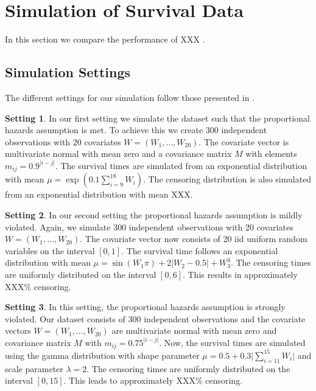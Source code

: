 \documentclass[12pt, a4paper]{article}
\theoremstyle{definition}
\newtheorem{setting}{Setting}
\theoremstyle{plain}
\numberwithin{equation}{section}
\numberwithin{figure}{section}
\numberwithin{table}{section}
\begin{document}
	\newpage

	\section{Simulation of Survival Data} \label{simulation}
	In this section we compare the performance of XXX
	.
	
	\subsection{Simulation Settings}

	The different settings for our simulation follow those presented in \citet*{culs}.
	
	\begin{setting}
		In our first setting we simulate the dataset such that the proportional hazards assumption is met.
		To achieve this we create 300 independent observations with 20 covariates $W=(W_1,\dots,W_{20})$.
		The covariate vector is multivariate normal with mean zero and a covariance matrix $M$ with elements $m_{ij}=0.9^{\vert i-j\vert}$.
		The survival times are simulated from an exponential distribution with mean $\mu = \exp\left(0.1\sum_{i=9}^{18}W_i\right)$.
		The censoring distribution is also simulated from an exponential distribution with mean XXX.
	\end{setting}

	\begin{setting}		
		In our second setting the proportional hazards assumption is mildly violated.
		Again, we simulate 300 independent observations with 20 covariates $W=(W_1,\dots, W_{20})$.
		The covariate vector now consists of 20 iid uniform random variables on the interval $[0,1]$.
		The survival time follows an exponential distribution with mean $\mu = \sin(W_1\pi)+2\vert W_2-0.5\vert + W_3^3$.
		The censoring times are uniformly distributed on the interval $[0,6]$.
		This results in approximately XXX\% censoring.
	\end{setting}
		
	\begin{setting}
		In this setting, the proportional hazards assumption is strongly violated.
		Our dataset consists of 300 independent observations and the covariate vectors $W=(W_1,\dots,W_{20})$ are multivariate normal with mean zero and covariance matrix $M$ with $m_{ij}=0.75^{\vert i-j\vert}$.
		Now, the survival times are simulated using the gamma distribution with shape parameter $\mu = 0.5 + 0.3 \vert \sum_{i=11}^{15} W_i \vert$ and scale parameter $\lambda = 2$.
		The censoring times are uniformly distributed on the interval $[0,15]$.
		This leads to approximately XXX\% censoring.
	\end{setting}
\end{document}
